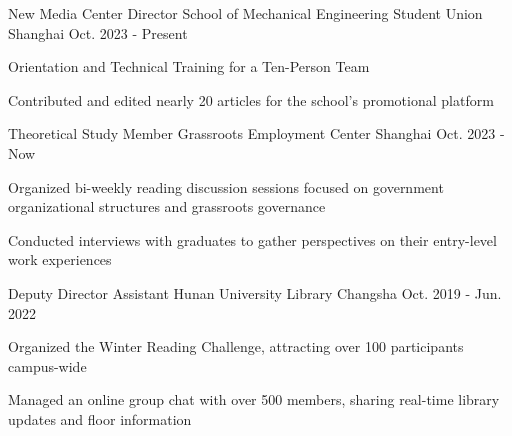 \vspace{-2mm} 

\begin{cventries}
	
\vspace{1mm} 	


	\cventry
{New Media Center Director} %
{School of Mechanical Engineering Student Union} %
{Shanghai}%
{Oct. 2023 - Present}
{
	\begin{cvitems} %
		\item{Orientation and Technical Training for a Ten-Person Team}
        \item {Contributed and edited nearly 20 articles for the school's promotional platform}
	\end{cvitems}
}

\vspace{4.0mm}  
\cventry
{ Theoretical Study Member} %
{Grassroots Employment Center} %
{Shanghai}
{Oct. 2023 - Now}
{
	\begin{cvitems} %
		\item{Organized bi-weekly reading discussion sessions focused on government organizational structures and grassroots governance}
        \item{Conducted interviews with graduates to gather perspectives on their entry-level work experiences}
	\end{cvitems}
} 
\end{cventries}

\vspace{4.0mm}  

	\cventry
{Deputy Director Assistant} %
{Hunan University Library} %
{Changsha}
{Oct. 2019 - Jun. 2022}
{
	\begin{cvitems} %
		\item{Organized the Winter Reading Challenge, attracting over 100 participants campus-wide}
        \item {Managed an online group chat with over 500 members, sharing real-time library updates and floor information}
	\end{cvitems}
}

